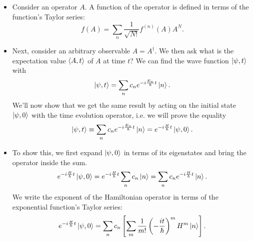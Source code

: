 \documentclass[11pt, a4paper]{article}
\begin{document}
\begin{itemize}
	\item Consider an operator $ A $. A function of the operator is defined in terms of the function's Taylor series:
	\begin{equation*}
		f(A) = \sum_{n} \frac{1}{\sqrt{N!}}f^{(n)}(A)A^{N}.
	\end{equation*}

	\item Next, consider an arbitrary observable $ A = A^{\dagger} $. We then ask what is the expectation value $ \ev{A, t} $ of $ A $ at time $ t $? We can find the wave function $ \ket{\psi, t} $ with
	\begin{equation*}
		\ket{\psi, t} = \sum_{n} c_{n}e^{-i \frac{E_{n}}{\hbar}t}\ket{n}.
	\end{equation*}
	We'll now show that we get the same result by acting on the initial state $ \ket{\psi, 0} $ with the time evolution operator, i.e. we will prove the equality
	\begin{equation*}
		\ket{\psi, t} \equiv \sum_{n} c_{n}e^{-i \frac{E_{n}}{\hbar}t}\ket{n} = e^{-i\frac{H}{\hbar}t}\ket{\psi, 0}.
	\end{equation*}
	
	\item To show this, we first expand $ \ket{\psi, 0} $ in terms of its eigenstates and bring the operator inside the sum.
	\begin{equation*}
		 e^{-i\frac{H}{\hbar}t}\ket{\psi, 0} =  e^{-i\frac{H}{\hbar}t}\sum_{n}c_{n}\ket{n} = \sum_{n}c_{n}e^{-i\frac{H}{\hbar}t}\ket{n}.
	\end{equation*}
	We write the exponent of the Hamiltonian operator in terms of the exponential function's Taylor series:
	\begin{equation*}
		e^{-i\frac{H}{\hbar}t}\ket{\psi, 0}  = \sum_{n}c_{n} \left[\sum_{m}\frac{1}{m!}\left (-\frac{it}{\hbar}\right )^{m}H^{m}\ket{n}\right].
	\end{equation*}
	

\end{itemize}
\end{document}
